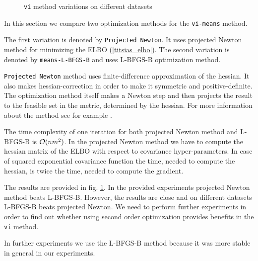 \begin{figure}[t!]
	\centering
	\subfloat{
		\scalebox{0.75}{
			
		}
	}
	\subfloat{
		\scalebox{0.75}{
    		
		}
	}

	\caption{ \lstinline{vi} method variations on different datasets}
	\label{vi_results}
\end{figure}

In this section we compare two optimization methods for the \lstinline{vi-means} method.

The first variation is denoted by \lstinline{Projected Newton}. It uses projected Newton method for minimizing the ELBO (\ref{titsias_elbo}). The second variation is denoted by \lstinline{means-L-BFGS-B} and uses L-BFGS-B optimization method.

\lstinline{Projected Newton} method uses finite-difference approximation of the hessian. It also makes hessian-correction in order to make it symmetric and positive-definite. The optimization method itself makes a Newton step and then projects the result to the feasible set in the metric, determined by the hessian. For more information about the method see for example \cite{ProjNewton}.

The time complexity of one iteration for both projected Newton method and L-BFGS-B is $\mathcal{O}(nm^2)$. In the projected Newton method we have to compute the hessian matrix of the ELBO with respect to covariance hyper-parameters. In case of squared exponential covariance function the time, needed to compute the hessian, is twice the time, needed to compute the gradient.

The results are provided in fig. \ref{vi_results}. In the provided experiments projected Newton method beats L-BFGS-B. However, the results are close and on different datasets L-BFGS-B beats projected Newton. We need to perform further experiments in order to find out whether using second order optimization provides benefits in the \lstinline{vi} method.

In further experiments we use the L-BFGS-B method because it was more stable in general in our experiments.
